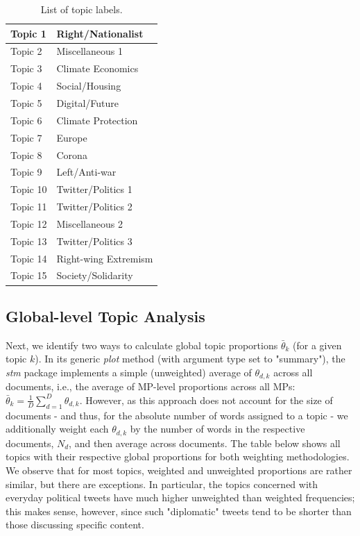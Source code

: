 \begin{table}[h!]
	\centering
	\captionsetup{justification=centering,margin=2cm}
	\begin{tabular}{|l|l|}
	\hline
	Topic 1  & Right/Nationalist    \\ \hline
	Topic 2  & Miscellaneous 1      \\ \hline
	Topic 3  & Climate Economics    \\ \hline
	Topic 4  & Social/Housing       \\ \hline
	Topic 5  & Digital/Future       \\ \hline
	Topic 6  & Climate Protection   \\ \hline
	Topic 7  & Europe               \\ \hline
	Topic 8  & Corona               \\ \hline
	Topic 9  & Left/Anti-war        \\ \hline
	Topic 10 & Twitter/Politics 1   \\ \hline
	Topic 11 & Twitter/Politics 2   \\ \hline
	Topic 12 & Miscellaneous 2      \\ \hline
	Topic 13 & Twitter/Politics 3   \\ \hline
	Topic 14 & Right-wing Extremism \\ \hline
	Topic 15 & Society/Solidarity   \\ \hline
	\end{tabular}
	\caption{List of topic labels.}
	\label{tab:labels}
\end{table}

\subsection{Global-level Topic Analysis}
\label{Global-level Topic Analysis}

Next, we identify two ways to calculate global topic proportions $\bar{\theta}_k$ (for a given topic $k$). In its generic \textit{plot} method (with argument type set to "summary"), the \textit{stm} package implements a simple (unweighted) average of $\theta_{d,k}$ across all documents, i.e., the average of MP-level proportions across all MPs: $\bar{\theta}_k = \frac{1}{D}\sum_{d=1}^{D}\theta_{d,k}$. However, as this approach does not account for the size of documents - and thus, for the absolute number of words assigned to a topic - we additionally weight each $\theta_{d,k}$ by the number of words in the respective documents, $N_d$, and then average across documents. The table below shows all topics with their respective global proportions for both weighting methodologies. We observe that for most topics, weighted and unweighted proportions are rather similar, but there are exceptions. In particular, the topics concerned with everyday political tweets have much higher unweighted than weighted frequencies; this makes sense, however, since such "diplomatic" tweets tend to be shorter than those discussing specific content.

